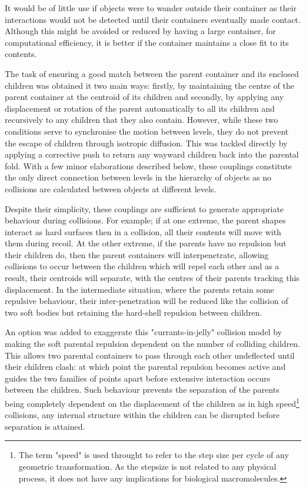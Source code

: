 \documentclass[review]{elsarticle}
\begin{document}
It would be of little use if objects were to wander outside their container as their
interactions would not be detected until their containers eventually made contact.
Although this might be avoided or reduced by having a large container, for computational
efficiency, it is better if the container maintains a close fit to its contents.

The task of ensuring a good match between the parent container and its enclosed
children was obtained it two main ways: firstly, by maintaining the centre of the
parent container at the centroid of its children and secondly, by applying any
displacement or rotation of the parent automatically to all its children and recursively
to any children that they also contain.   However, while these two conditions serve
to synchronise the motion between levels, they do not prevent the escape of children
through isotropic diffusion.   This was tackled directly by applying a corrective push
to return any wayward children back into the parental fold.   With a few minor elaborations
described below, these couplings constitute the only direct connection between levels in the
hierarchy of objects as no collisions are calculated between objects at different levels.

Despite their simplicity, these couplings are sufficient to generate appropriate
behaviour during collisions.   For example; if at one extreme, the parent shapes interact
as hard surfaces then in a collision, all their contents will move with them during
recoil.   At the other extreme, if the parents have no repulsion but their children do,
then the parent containers will interpenetrate, allowing collisions to occur between
the children which will repel each other and as a result, their centroids will 
separate, with the centres of their parents tracking this displacement.   In the intermediate
situation, where the parents retain some repulsive behaviour, their inter-penetration
will be reduced like the collision of two soft bodies but retaining the hard-shell
repulsion between children.   

An option was added to exaggerate this "currants-in-jelly" collision model by making
the soft parental repulsion dependent on the number of colliding children.   This
allows two parental containers to pass through each other undeflected until their
children clash: at which point the parental repulsion becomes active and guides the
two families of points apart before extensive interaction occurs between the 
children.   Such behaviour prevents the separation of the parents being completely
dependent on the displacement of the children as in high speed\footnote{
The term "speed" is used throught to refer to the step size per cycle of any
geometric transformation.   As the stepsize is not related to any physical
process, it does not have any implications for biological macromolecules.
}
collisions, any
internal structure within the children can be disrupted before separation is attained.
\end{document}
